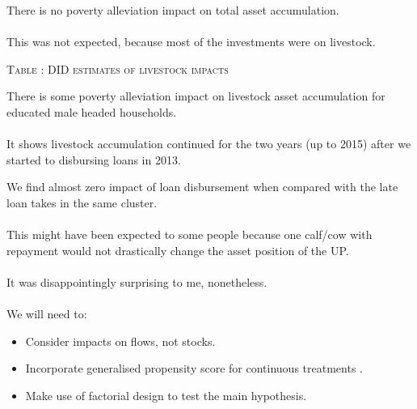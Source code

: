 \begin{frame}{}
There is no poverty alleviation impact on total asset accumulation. \\~\\
\pause
\vspace{2ex}
This was not expected, because most of the investments were on livestock.
\end{frame}

\begin{frame}{}
\hfil\textsc{\footnotesize Table \thetable: DID estimates of livestock impacts\label{FDlivestock}}\\
\setlength{\tabcolsep}{1pt}
\renewcommand{\arraystretch}{.6}
\hfil{}
\end{frame}

\begin{frame}{}
There is some poverty alleviation impact on livestock asset accumulation for educated male headed households. \\~\\
\pause
\vspace{2ex}
It shows livestock accumulation continued for the two years (up to 2015) after we started to disbursing loans in 2013.
\end{frame}

\begin{frame}{}
We find almost zero impact of loan disbursement when compared with the late loan takes in the same cluster. \\~\\
\pause
This might have been expected to some people because one calf/cow with repayment would not drastically change the asset position of the UP.\\~\\
\pause
It was disappointingly surprising to me, nonetheless.\\~\\
\pause
We will need to:
\begin{itemize}
\vspace{1.0ex}\setlength{\itemsep}{1.0ex}\setlength{\baselineskip}{12pt}
\item	Consider impacts on flows, not stocks.
\item	Incorporate generalised propensity score for continuous treatments \citet{Imbens2000, HiranoImbens2004, ImaiVanDyk2004, Egger2013}.
\item	Make use of factorial design to test the main hypothesis.
\end{itemize}
\end{frame}

